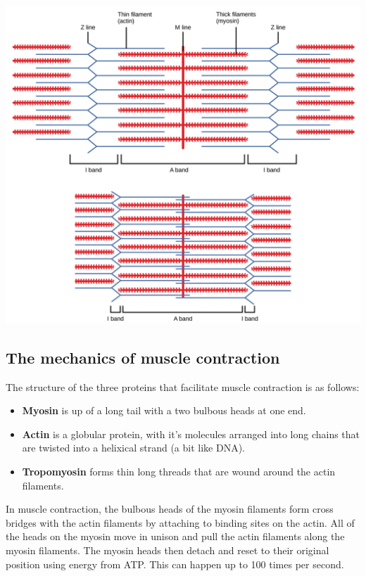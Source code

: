 \documentclass{article}
\begin{document}
\begin{center}
	\includegraphics[scale=0.65]{contraction}
\end{center}

\subsection*{The mechanics of muscle contraction}

The structure of the three proteins that facilitate muscle contraction is as
follows:

\begin{itemize}

	\item {\bf Myosin} is up of a long tail with a two bulbous heads at one end.

	\item {\bf Actin} is a globular protein, with it's molecules arranged into
	long chains that are twisted into a helixical strand (a bit like DNA).

	\item {\bf Tropomyosin} forms thin long threads that are wound around the
	actin filaments.

\end{itemize}

In muscle contraction, the bulbous heads of the myosin filaments form cross
bridges with the actin filaments by attaching to binding sites on the actin. All
of the heads on the myosin move in unison and pull the actin filaments along the
myosin filaments. The myosin heads then detach and reset to their original
position using energy from ATP. This can happen up to 100 times per second.
\end{document}
